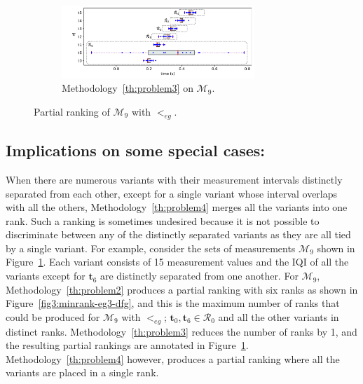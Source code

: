 \documentclass[acmsmall,screen, review]{acmart}
\begin{document}
\begin{figure}[h!]
	\hfill
	
	\begin{subfigure}{0.85\textwidth}
		\centering
		\includegraphics[width=0.8\textwidth]{fig/ch3/minrank-eg3-r}
		\caption{Methodology~\ref{th:problem3} on $\mathcal{M}_{9}$.}
		\label{fig3:minrank-eg3-r}
	\end{subfigure}
	
	\caption{Partial ranking of $\mathcal{M}_{9}$ with $<_{eg}$.  }
	\label{fig3:minrank-eg3}
\end{figure}

\subsection{Implications on some special cases:} 
When there are numerous variants with their measurement intervals distinctly separated from each other, except for a single variant whose interval overlaps with all the others, Methodology~\ref{th:problem4} merges all the variants into one rank. Such a ranking is sometimes undesired because it is not possible to discriminate between any of the distinctly separated variants as they are all tied by a single variant. 
For example, consider the sets of measurements $\mathcal{M}_{9}$ shown in Figure~\ref{fig3:minrank-eg3-r}. Each variant consists of 15 measurement values and the IQI of all the variants except for $\mathbf{t}_6$ are distinctly separated from one another. 
For $\mathcal{M}_{9}$, Methodology~\ref{th:problem2} produces a partial ranking with six ranks as shown in Figure~\ref{fig3:minrank-eg3-dfg}, and this is the maximum number of ranks that could be produced for $\mathcal{M}_{9}$ with $<_{eg}$; $\mathbf{t}_0, \mathbf{t}_6 \in \mathcal{R}_0$ and all the other variants in distinct ranks. Methodology~\ref{th:problem3} reduces the number of ranks by 1, and the resulting partial rankings are annotated in Figure~\ref{fig3:minrank-eg3-r}.
Methodology~\ref{th:problem4} however, produces a partial ranking where all the variants are placed in a single rank. %
\end{document}
